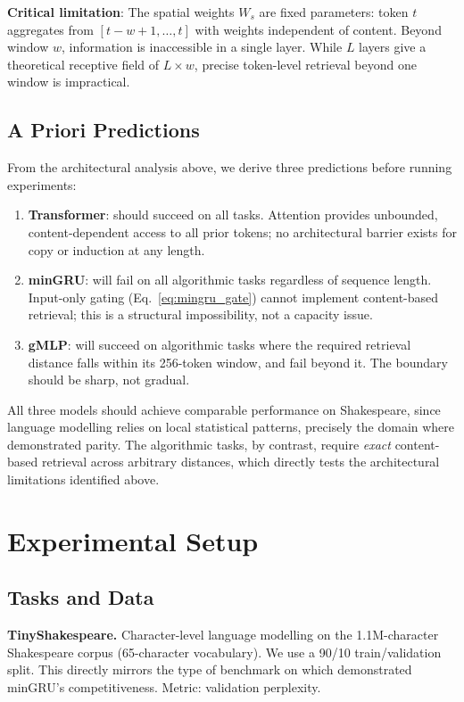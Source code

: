 \documentclass[10pt,a4paper]{article}
\begin{document}
\textbf{Critical limitation}: The spatial weights $W_s$ are fixed parameters: token $t$ aggregates from $[t{-}w{+}1, \ldots, t]$ with weights independent of content. Beyond window $w$, information is inaccessible in a single layer. While $L$ layers give a theoretical receptive field of $L \times w$, precise token-level retrieval beyond one window is impractical.

\subsection{A Priori Predictions}

From the architectural analysis above, we derive three predictions before running experiments:

\begin{enumerate}
    \item \textbf{Transformer}: should succeed on all tasks. Attention provides unbounded, content-dependent access to all prior tokens; no architectural barrier exists for copy or induction at any length.
    \item \textbf{minGRU}: will fail on all algorithmic tasks regardless of sequence length. Input-only gating (Eq.~\ref{eq:mingru_gate}) cannot implement content-based retrieval; this is a structural impossibility, not a capacity issue.
    \item \textbf{gMLP}: will succeed on algorithmic tasks where the required retrieval distance falls within its 256-token window, and fail beyond it. The boundary should be sharp, not gradual.
\end{enumerate}

All three models should achieve comparable performance on Shakespeare, since language modelling relies on local statistical patterns, precisely the domain where \citet{feng2024were} demonstrated parity. The algorithmic tasks, by contrast, require \emph{exact} content-based retrieval across arbitrary distances, which directly tests the architectural limitations identified above.

\section{Experimental Setup}

\subsection{Tasks and Data}

\textbf{TinyShakespeare.} Character-level language modelling on the 1.1M-character Shakespeare corpus (65-character vocabulary). We use a 90/10 train/validation split. This directly mirrors the type of benchmark on which \citet{feng2024were} demonstrated minGRU's competitiveness. Metric: validation perplexity.
\end{document}
